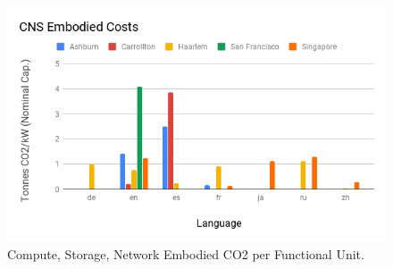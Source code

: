 \begin{figure}[h!]\centering
    \includegraphics[scale=0.65]{embodied_cost_model/images/CNS Embodied Costs.png}
    \caption[Compute, Storage, Network Embodied CO2 per Functional Unit]{Compute, Storage, Network Embodied CO2 per Functional Unit.}
    \label{img: cns_co2}
\end{figure}